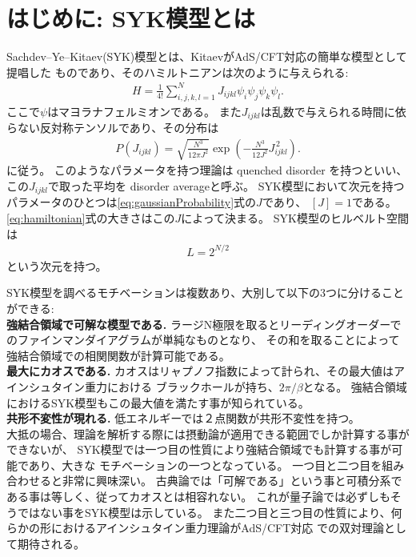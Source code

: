 \section{はじめに: SYK模型とは}
Sachdev--Ye--Kitaev(SYK)模型とは、KitaevがAdS/CFT対応の簡単な模型として提唱した
ものであり、そのハミルトニアンは次のように与えられる:
\begin{align}
  H = \frac{1}{4!}\sum_{i,j,k,l = 1}^{N} J_{ijkl}\psi_i\psi_j\psi_k\psi_l.
  \label{eq:hamiltonian}
\end{align}
ここで$\psi$はマヨラナフェルミオンである。
また$J_{ijkl}$は乱数で与えられる時間に依らない反対称テンソルであり、その分布は
\begin{align}
  P(J_{ijkl}) = \sqrt{\frac{N^3}{12\pi J^2}}
                \exp\left(-\frac{N^3}{12J^2}J_{ijkl}^{\, 2}\right).
	\label{eq:gaussianProbability}
\end{align}
に従う。
このようなパラメータを持つ理論は quenched disorder を持つといい、
この$J_{ijkl}$で取った平均を disorder averageと呼ぶ。
SYK模型において次元を持つパラメータのひとつは\eqref{eq:gaussianProbability}式の$J$であり、
$[J] = 1$である。\eqref{eq:hamiltonian}式の大きさはこの$J$によって決まる。
SYK模型のヒルベルト空間は
\begin{align}
	L = 2^{N/2}
\end{align}
という次元を持つ。

SYK模型を調べるモチベーションは複数あり、大別して以下の3つに分けることができる:\\

\textbf{強結合領域で可解な模型である.}
ラージN極限を取るとリーディングオーダーでのファインマンダイアグラムが単純なものとなり、
その和を取ることによって強結合領域での相関関数が計算可能である。\\

\textbf{最大にカオスである.}
カオスはリャプノフ指数によって計られ、その最大値はアインシュタイン重力における
ブラックホールが持ち、$2\pi / \beta$となる\cite{shenker}。
強結合領域におけるSYK模型もこの最大値を満たす事が知られている\cite{maldacena}。\\

\textbf{共形不変性が現れる.}
低エネルギーでは２点関数が共形不変性を持つ。\\

大抵の場合、理論を解析する際には摂動論が適用できる範囲でしか計算する事ができないが、
SYK模型では一つ目の性質により強結合領域でも計算する事が可能であり、大きな
モチベーションの一つとなっている。
一つ目と二つ目を組み合わせると非常に興味深い。
古典論では「可解である」という事と可積分系である事は等しく、従ってカオスとは相容れない\cite{polchinski}。
これが量子論では必ずしもそうではない事をSYK模型は示している。
また二つ目と三つ目の性質により、何らかの形におけるアインシュタイン重力理論がAdS/CFT対応
での双対理論として期待される。

